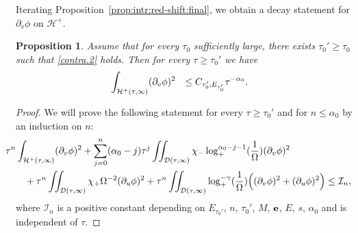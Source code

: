 \documentclass[10pt, reqno]{amsart}
\newtheorem{proposition}[theorem]{Proposition}
\theoremstyle{definition}
\theoremstyle{remark}
\numberwithin{equation}{section}
\newcommand{\rd}{\partial}
\newcommand{\bb}{\Big}
\newcommand{\0}{\emptyset}
\newcommand{\alp}{\alpha}
\newcommand{\Omg}{\Omega}
\newcommand{\calD}{\mathcal D}
\newcommand{\calH}{\mathcal H}
\newcommand{\calI}{\mathcal I}
\newcommand{\f}{\frac}
\newcommand{\EH}{\calH^{+}}
\begin{document}
Iterating Proposition~\ref{prop:intr:red-shift:final}, we obtain a decay statement for $\rd_{v} \phi$ on $\EH$.
\begin{proposition} \label{prop:intr:decay}
Assume that for every $\tau_0$ sufficiently large, there exists $\tau_0'\geq \tau_0$ such that \eqref{contra.2} holds. Then for every $\tau \geq \tau_0'$ we have
\begin{equation} \label{eq:intr:decay}
\begin{aligned}
& \hskip-2em
	\int_{\EH(\tau, \infty)} (\rd_{v} \phi)^{2} 
	& \leq C_{\tau_0', E_{\tau_0'}} \tau^{- \alp_{0}}.
\end{aligned}
\end{equation}

\end{proposition}

\begin{proof} 
We will prove the following statement for every $\tau\geq \tau_0'$ and for $n \leq \alp_{0}$ by an induction on $n$:
\begin{equation} \label{eq:intr:decay:indHyp}
\begin{aligned}
& \hskip-2em
	\tau^{n} \int_{\EH(\tau, \infty)} (\rd_{v} \phi)^{2} 
	+ \sum_{j=0}^{n} (\alp_{0} - j) \tau^{j} \iint_{\calD(\tau, \infty)} \chi_{-} \log_+^{\alp_{0}-j-1} (\frac{1}{\Omg}) (\rd_{v} \phi)^{2} \\
	& + \tau^{n} \iint_{\calD(\tau, \infty)} \chi_{+} \Omg^{-2} (\rd_{u} \phi)^{2} 
	+ \tau^{n} \iint_{\calD(\tau, \infty)} \log_+^{-\gamma}(\f{1}{\Omg}) \bb( (\rd_{v} \phi)^{2} + (\rd_{u} \phi)^{2} \bb)
	\leq \calI_{n},
\end{aligned}
\end{equation}
where $\calI_{n}$ is a positive constant depending on $E_{\tau_0'}$, $n$, $\tau_0'$, $M$, ${\bf e}$, $E$, $s$, $\alp_0$ and is independent of $\tau$.


\end{proof}
\end{document}
